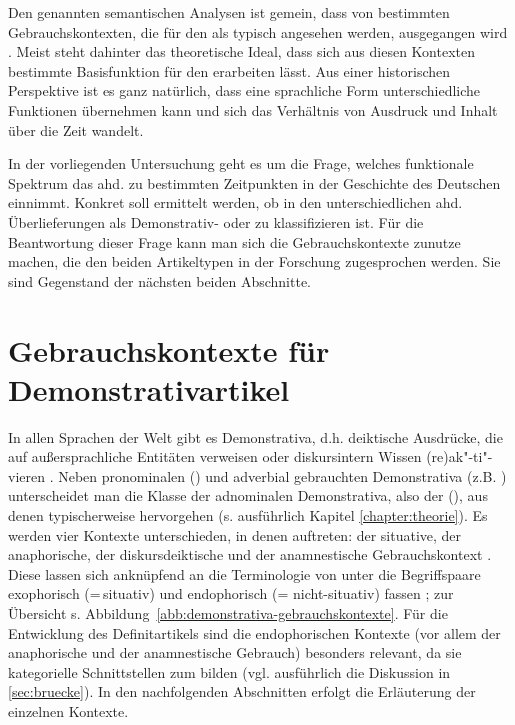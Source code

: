 Den genannten  semantischen Analysen ist gemein, dass von bestimmten Gebrauchskontexten, die für den  als typisch angesehen werden, ausgegangen wird \parencite[9]{Cui2014}. Meist steht dahinter das theoretische Ideal, dass sich aus diesen Kontexten  bestimmte Basisfunktion für den  erarbeiten lässt. Aus einer historischen Perspektive ist es ganz natürlich, dass eine sprachliche Form unterschiedliche Funktionen übernehmen kann und sich das Verhältnis von Ausdruck und Inhalt über die Zeit wandelt. 

In der vorliegenden Untersuchung geht es um die Frage, welches funktionale Spektrum das ahd.  zu bestimmten Zeitpunkten in der Geschichte des Deutschen einnimmt. Konkret soll ermittelt werden, ob  in den unterschiedlichen ahd. Überlieferungen als Demonstrativ-  oder  zu klassifizieren ist. Für die Beantwortung dieser Frage kann man sich die Gebrauchskontexte  zunutze machen, die den beiden Artikeltypen in der Forschung zugesprochen werden. Sie sind Gegenstand der nächsten beiden Abschnitte. 


\section{Gebrauchskontexte für Demonstrativartikel}\label{sec:demonstrativartikel}

In allen Sprachen der Welt gibt es Demonstrativa, d.h. deiktische Ausdrücke, die auf außersprachliche Entitäten verweisen oder diskursintern Wissen (re)ak"-ti"-vieren \parencite{Diessel1999, Diessel2006}. Neben pronominalen () und adverbial gebrauchten Demonstrativa   (z.B. ) unterscheidet man die Klasse der adnominalen  Demonstrativa, also der  (), aus denen   typischerweise hervorgehen (s. ausführlich Kapitel \ref{chapter:theorie}). Es werden vier Kontexte unterschieden, in denen  auftreten: der  situative, der  anaphorische, der diskursdeiktische  und der anamnestische  Gebrauchskontext \parencite[s. u.a.][]{Hawkins1978,Lyons1979,Bisle-Muller1991,Himmelmann1996,Himmelmann1997,Fillmore1997,Diessel1999,Schwarz2000,Consten2004,Diessel2006,Diessel2012, Studler2011}. Diese lassen sich anknüpfend an die Terminologie von \textcite{Halliday1993} unter die Begriffspaare exophorisch (=\,situativ) und endophorisch (= nicht-situativ) fassen \parencite[vgl. auch][6]{Diessel1999}; zur Übersicht s. Abbildung~\ref{abb:demonstrativa-gebrauchskontexte}. Für die Entwicklung des Definitartikels sind die endophorischen Kontexte (vor allem der anaphorische  und der anamnestische  Gebrauch) besonders relevant, da sie kategorielle Schnittstellen zum  bilden (vgl. ausführlich die Diskussion in \ref{sec:bruecke}). In den nachfolgenden Abschnitten erfolgt die Erläuterung der einzelnen Kontexte.

